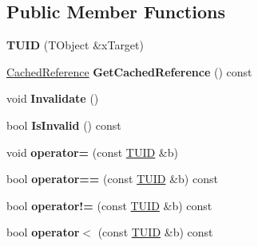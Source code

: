 \subsection*{Public Member Functions}
\begin{DoxyCompactItemize}
\item 
\hypertarget{class_k_g_e_1_1_t_u_i_d_abf6fc57819dc1f875ab707dc505e9019}{{\bfseries T\-U\-I\-D} (T\-Object \&x\-Target)}\label{class_k_g_e_1_1_t_u_i_d_abf6fc57819dc1f875ab707dc505e9019}

\item 
\hypertarget{class_k_g_e_1_1_t_u_i_d_a62f3668bcd3e59b63d1ae7b5767d28bf}{\hyperlink{class_k_g_e_1_1_t_u_i_d_1_1_cached_reference}{Cached\-Reference} {\bfseries Get\-Cached\-Reference} () const }\label{class_k_g_e_1_1_t_u_i_d_a62f3668bcd3e59b63d1ae7b5767d28bf}

\item 
\hypertarget{class_k_g_e_1_1_t_u_i_d_a176685d0697073bb1c884ecff5610cd1}{void {\bfseries Invalidate} ()}\label{class_k_g_e_1_1_t_u_i_d_a176685d0697073bb1c884ecff5610cd1}

\item 
\hypertarget{class_k_g_e_1_1_t_u_i_d_abb94f7ce3ac1b06030d59982ef57d1e4}{bool {\bfseries Is\-Invalid} () const }\label{class_k_g_e_1_1_t_u_i_d_abb94f7ce3ac1b06030d59982ef57d1e4}

\item 
\hypertarget{class_k_g_e_1_1_t_u_i_d_a991ec67886d4010209a8b8284260d7f7}{void {\bfseries operator=} (const \hyperlink{class_k_g_e_1_1_t_u_i_d}{T\-U\-I\-D} \&b)}\label{class_k_g_e_1_1_t_u_i_d_a991ec67886d4010209a8b8284260d7f7}

\item 
\hypertarget{class_k_g_e_1_1_t_u_i_d_af87d643733c348eb22122847f3b2c974}{bool {\bfseries operator==} (const \hyperlink{class_k_g_e_1_1_t_u_i_d}{T\-U\-I\-D} \&b) const }\label{class_k_g_e_1_1_t_u_i_d_af87d643733c348eb22122847f3b2c974}

\item 
\hypertarget{class_k_g_e_1_1_t_u_i_d_a716b9cde910775c2d0d40f963f285f1f}{bool {\bfseries operator!=} (const \hyperlink{class_k_g_e_1_1_t_u_i_d}{T\-U\-I\-D} \&b) const }\label{class_k_g_e_1_1_t_u_i_d_a716b9cde910775c2d0d40f963f285f1f}

\item 
\hypertarget{class_k_g_e_1_1_t_u_i_d_a10d364e97335e4d3ba4a2578c6dbbb39}{bool {\bfseries operator$<$} (const \hyperlink{class_k_g_e_1_1_t_u_i_d}{T\-U\-I\-D} \&b) const }\label{class_k_g_e_1_1_t_u_i_d_a10d364e97335e4d3ba4a2578c6dbbb39}

\end{DoxyCompactItemize}
